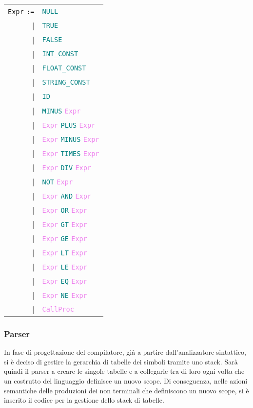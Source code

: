 \documentclass[a4paper,12pt]{article}
\newcommand\nonterm[1]{\texttt{\textcolor{violet}{#1}}}
\newcommand\term[1]{\texttt{\textcolor{teal}{#1}}}
\newcommand\production[1]{\texttt{#1} \texttt{:=}}
\begin{document}
  \begin{tabular}{rl}
   \production{Expr}                    & \term{NULL} \\
						|& \term{TRUE} \\
						|& \term{FALSE} \\
						|& \term{INT\_CONST} \\
						|& \term{FLOAT\_CONST} \\
						|& \term{STRING\_CONST} \\
						|& \term{ID} \\
    				                 |& \term{MINUS} \nonterm{Expr} \\
						|& \nonterm{Expr} \term{PLUS} \nonterm{Expr} \\
						|& \nonterm{Expr} \term{MINUS} \nonterm{Expr} \\ 
						|& \nonterm{Expr} \term{TIMES} \nonterm{Expr} \\
						|& \nonterm{Expr} \term{DIV} \nonterm{Expr} \\
    						|& \term{NOT} \nonterm{Expr} \\
						|& \nonterm{Expr} \term{AND} \nonterm{Expr} \\
						|& \nonterm{Expr} \term{OR} \nonterm{Expr} \\
						|& \nonterm{Expr} \term{GT} \nonterm{Expr} \\
						|& \nonterm{Expr} \term{GE} \nonterm{Expr} \\
						|& \nonterm{Expr} \term{LT} \nonterm{Expr} \\
						|& \nonterm{Expr} \term{LE} \nonterm{Expr} \\
						|& \nonterm{Expr} \term{EQ} \nonterm{Expr} \\
						|& \nonterm{Expr} \term{NE} \nonterm{Expr} \\
						|& \nonterm{CallProc} \\
    \end{tabular}

	\subsubsection{Parser}
	In fase di progettazione del compilatore, già a partire dall'analizzatore sintattico, si è deciso di gestire la gerarchia di tabelle dei simboli tramite uno stack.
	Sarà quindi il parser a creare le singole tabelle e a collegarle tra di loro ogni volta che un costrutto del linguaggio definisce un nuovo scope.
	Di conseguenza, nelle azioni semantiche delle produzioni dei non terminali che definiscono un nuovo scope, si è inserito il codice per la gestione
	dello stack di tabelle.
	
\end{document}
